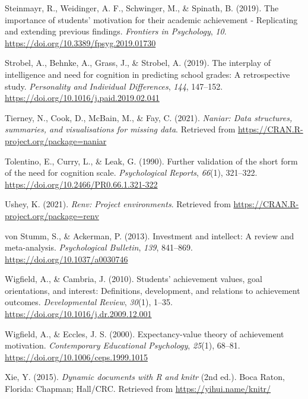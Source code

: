 \documentclass[
  man]{apa6}
\newlength{\cslhangindent}
\newlength{\cslentryspacingunit} %
\newenvironment{CSLReferences}[2] %
 {%
  \setlength{\parindent}{0pt}
  \ifodd #1
  \let\oldpar\par
  \def\par{\hangindent=\cslhangindent\oldpar}
  \fi
  \setlength{\parskip}{#2\cslentryspacingunit}
 }%
 {}
\begin{document}
\begin{CSLReferences}{1}{0}
\leavevmode{}%
Steinmayr, R., Weidinger, A. F., Schwinger, M., \& Spinath, B. (2019). The importance of students' motivation for their academic achievement - {R}eplicating and extending previous findings. \emph{Frontiers in Psychology}, \emph{10}. \url{https://doi.org/10.3389/fpsyg.2019.01730}

\leavevmode{}%
Strobel, A., Behnke, A., Grass, J., \& Strobel, A. (2019). The interplay of intelligence and need for cognition in predicting school grades: A retrospective study. \emph{Personality and Individual Differences}, \emph{144}, 147--152. \url{https://doi.org/10.1016/j.paid.2019.02.041}

\leavevmode{}%
Tierney, N., Cook, D., McBain, M., \& Fay, C. (2021). \emph{Naniar: Data structures, summaries, and visualisations for missing data}. Retrieved from \url{https://CRAN.R-project.org/package=naniar}

\leavevmode{}%
Tolentino, E., Curry, L., \& Leak, G. (1990). Further validation of the short form of the need for cognition scale. \emph{Psychological Reports}, \emph{66}(1), 321--322. \url{https://doi.org/10.2466/PR0.66.1.321-322}

\leavevmode{}%
Ushey, K. (2021). \emph{Renv: Project environments}. Retrieved from \url{https://CRAN.R-project.org/package=renv}

\leavevmode{}%
von Stumm, S., \& Ackerman, P. (2013). Investment and intellect: A review and meta-analysis. \emph{Psychological Bulletin}, \emph{139}, 841--869. \url{https://doi.org/10.1037/a0030746}

\leavevmode{}%
Wigfield, A., \& Cambria, J. (2010). Students' achievement values, goal orientations, and interest: Definitions, development, and relations to achievement outcomes. \emph{Developmental Review}, \emph{30}(1), 1--35. \url{https://doi.org/10.1016/j.dr.2009.12.001}

\leavevmode{}%
Wigfield, A., \& Eccles, J. S. (2000). Expectancy-value theory of achievement motivation. \emph{Contemporary Educational Psychology}, \emph{25}(1), 68--81. \url{https://doi.org/10.1006/ceps.1999.1015}

\leavevmode{}%
Xie, Y. (2015). \emph{Dynamic documents with {R} and knitr} (2nd ed.). Boca Raton, Florida: Chapman; Hall/CRC. Retrieved from \url{https://yihui.name/knitr/}

\end{CSLReferences}

\endgroup

\newpage
\end{document}
